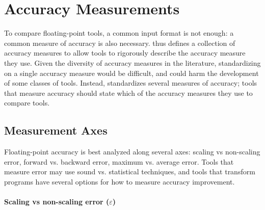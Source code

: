 \documentclass[main.tex]{subfiles}
\begin{document}
\section{Accuracy Measurements}
\label{sec:measure}

To compare floating-point tools,
  a common input format is not enough:
  a common measure of accuracy is also necessary.
\name thus defines a collection of accuracy measures
  to allow tools to rigorously describe the accuracy measure they use.
Given the diversity of accuracy measures in the literature,
  standardizing on a single accuracy measure
  would be difficult, and could harm the development
  of some classes of tools.
Instead, \name standardizes
  several measures of accuracy;
  tools that measure accuracy
  should state which of the \name accuracy measures they use
  to compare tools.

\subsection{Measurement Axes}

Floating-point accuracy is best analyzed along several axes:
  scaling vs non-scaling error, forward vs. backward error,
  maximum vs. average error.
Tools that measure error may use sound vs. statistical techniques,
  and tools that transform programs
  have several options for how to measure accuracy improvement.

\paragraph{Scaling vs non-scaling error ($\varepsilon$)}
\end{document}
